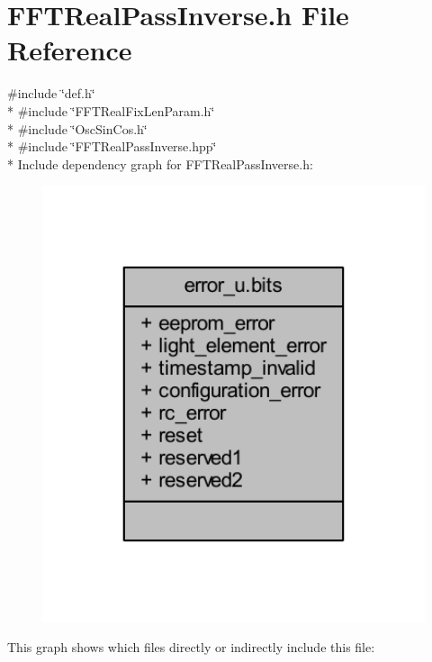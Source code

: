\hypertarget{a00102}{\section{F\+F\+T\+Real\+Pass\+Inverse.\+h File Reference}
\label{a00102}
}
{\ttfamily \#include \char`\"{}def.\+h\char`\"{}}\\*
{\ttfamily \#include \char`\"{}F\+F\+T\+Real\+Fix\+Len\+Param.\+h\char`\"{}}\\*
{\ttfamily \#include \char`\"{}Osc\+Sin\+Cos.\+h\char`\"{}}\\*
{\ttfamily \#include \char`\"{}F\+F\+T\+Real\+Pass\+Inverse.\+hpp\char`\"{}}\\*
Include dependency graph for F\+F\+T\+Real\+Pass\+Inverse.\+h\+:
\nopagebreak
\begin{figure}[H]
\begin{center}
\leavevmode
\includegraphics[width=350pt]{d1/dd4/a00267}
\end{center}
\end{figure}
This graph shows which files directly or indirectly include this file\+:
\nopagebreak
